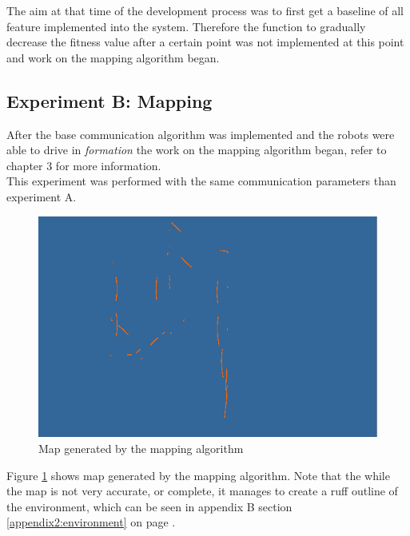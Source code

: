 The aim at that time of the development process was to first get a baseline of all feature implemented into the system.
Therefore the function to gradually decrease the fitness value after a certain point was not implemented at this point and work on the mapping algorithm began.

\subsection{Experiment B: Mapping}
After the base  communication algorithm was implemented and the robots were able to drive in \textit{formation} the work on the mapping algorithm began, refer to chapter 3 for more information. \\

This experiment was performed with the same communication parameters than experiment A. 

\begin{figure}[h]
\centering
\includegraphics[scale=0.5]{Chapter4/images/map1.png}
\caption{Map generated by the mapping algorithm}
\label{fig:map1}
\end{figure}

Figure \ref{fig:map1} shows map generated by the mapping algorithm.
Note that the while the map is not very accurate, or complete, it manages to create a ruff outline of the environment, which can be seen in appendix B section \ref{appendix2:environment} on page \pageref{appendix2:environment}. \\

